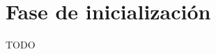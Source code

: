 \documentclass[11pt,spanish,listoffigures,listoftables]{tfgetsinf}
\begin{document}
\section{Fase de inicialización}

TODO




\end{document}
